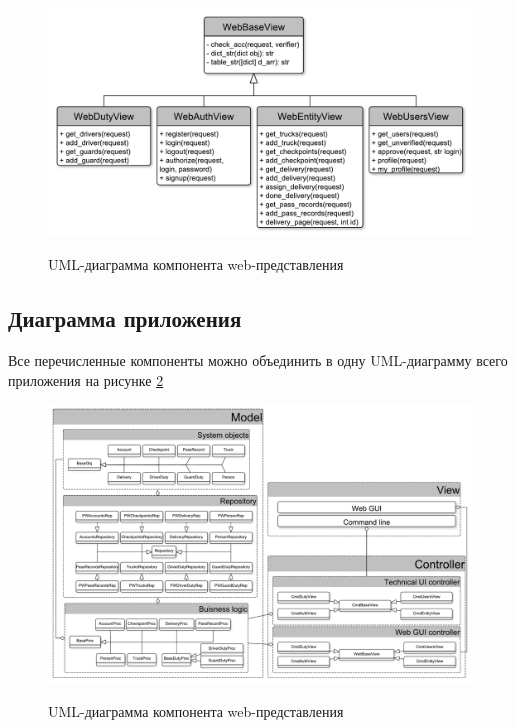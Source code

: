 \begin{figure}[h!] 
	\begin{center}
		{\includegraphics[scale=0.5, angle=0]{uml/webGUI.pdf}}
		\caption{UML-диаграмма компонента web-представления}
		\label{view_pic}
	\end{center}
\end{figure}

\newpage
\subsection{Диаграмма приложения}
Все перечисленные компоненты можно объединить в одну UML-диаграмму всего приложения на рисунке \ref{alluml_pic}

\begin{figure}[h!] 
	\begin{center}
		{\includegraphics[scale=0.36, angle=-90]{uml/components.pdf}}
		\caption{UML-диаграмма компонента web-представления}
		\label{alluml_pic}
	\end{center}
\end{figure}


